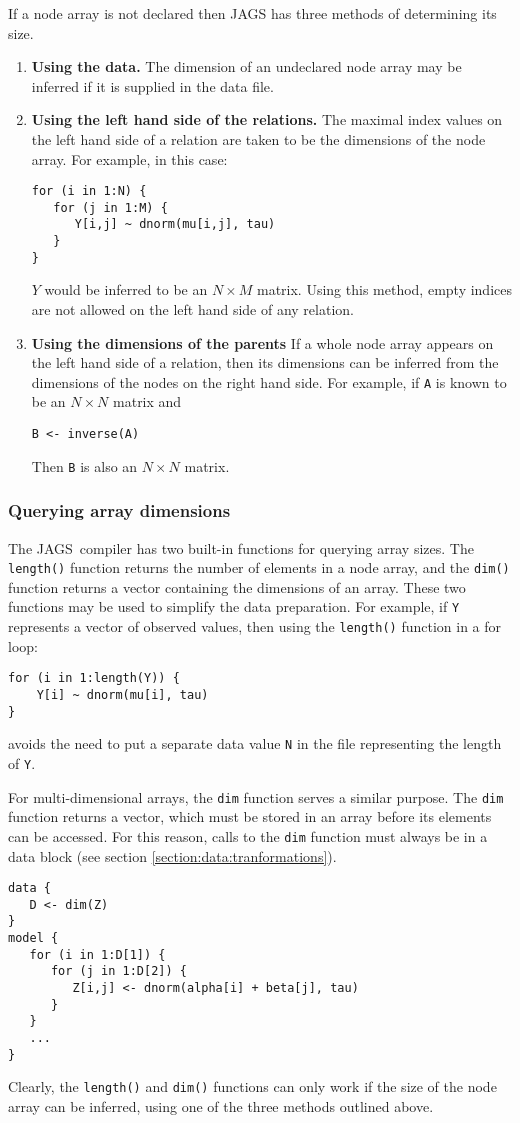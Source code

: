\documentclass[11pt, a4paper, titlepage]{report}
\newcommand{\JAGS}{\textsf{JAGS}}
\begin{document}
If a node array is not declared then JAGS has three methods of
determining its size.
\begin{enumerate}
\item {\bf Using the data.}  The dimension of an undeclared node array
  may be inferred if it is supplied in the data file.
\item {\bf Using the left hand side of the relations.}  The maximal
  index values on the left hand side of a relation are taken to be the
  dimensions of the node array.  For example, in this case:
\begin{verbatim}
for (i in 1:N) {
   for (j in 1:M) {
      Y[i,j] ~ dnorm(mu[i,j], tau)
   }
}
\end{verbatim}
$Y$ would be inferred to be an $N \times M$ matrix. Using this method,
empty indices are not allowed on the left hand side of any relation.
\item {\bf Using the dimensions of the parents} If a whole node array
  appears on the left hand side of a relation, then its dimensions can
  be inferred from the dimensions of the nodes on the right hand side.
  For example, if \verb+A+ is known to be an $N \times N$ matrix
  and
\begin{verbatim}
B <- inverse(A)
\end{verbatim}
Then \verb+B+ is also an $N \times N$ matrix.
\end{enumerate}

\subsubsection*{Querying array dimensions}  

The \JAGS\ compiler has two built-in functions for querying array
sizes.  The \verb+length()+ function returns the number of elements in
a node array, and the \verb+dim()+ function returns a vector
containing the dimensions of an array.  These two functions may be
used to simplify the data preparation. For example, if \verb+Y+
represents a vector of observed values, then using the \verb+length()+
function in a for loop:
\begin{verbatim}
for (i in 1:length(Y)) {
    Y[i] ~ dnorm(mu[i], tau)
}
\end{verbatim}
avoids the need to put a separate data value \verb+N+ in the file
representing the length of \verb+Y+.  

For multi-dimensional arrays, the \verb+dim+ function serves a similar
purpose. The \verb+dim+ function returns a vector, which must be stored
in an array before its elements can be accessed. For this reason, calls
to the \verb+dim+ function must always be in a data block (see section
\ref{section:data:tranformations}).
\begin{verbatim}
data {
   D <- dim(Z)
}
model {
   for (i in 1:D[1]) {
      for (j in 1:D[2]) {
         Z[i,j] <- dnorm(alpha[i] + beta[j], tau)
      }
   }
   ...
}
\end{verbatim}
Clearly, the \verb+length()+ and \verb+dim()+ functions can only
work if the size of the node array can be inferred, using one of the
three methods outlined above.
\end{document}
